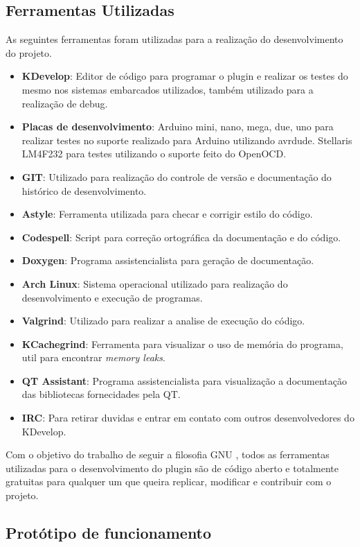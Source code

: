\subsection{Ferramentas Utilizadas}
As seguintes ferramentas foram utilizadas para a realização do desenvolvimento do projeto.
\begin{itemize}
 \item \textbf{KDevelop}: Editor de código para programar o plugin e realizar os testes do mesmo nos sistemas embarcados utilizados,
 também utilizado para a realização de debug.
 \item \textbf{Placas de desenvolvimento}: Arduino mini, nano, mega, due, uno para realizar testes no suporte realizado para Arduino
 utilizando avrdude. Stellaris LM4F232 para testes utilizando o suporte feito do OpenOCD.
 \item \textbf{GIT}: Utilizado para realização do controle de versão e documentação do  histórico de desenvolvimento.
 \item \textbf{Astyle}: Ferramenta utilizada para checar e corrigir estilo do código.
 \item \textbf{Codespell}: Script para correção ortográfica da documentação e do código.
 \item \textbf{Doxygen}: Programa assistencialista para geração de documentação.
 \item \textbf{Arch Linux}: Sistema operacional utilizado para realização do desenvolvimento e execução de programas.
 \item \textbf{Valgrind}: Utilizado para realizar a analise de execução do código.
 \item \textbf{KCachegrind}: Ferramenta para visualizar o uso de memória do programa, util para encontrar \textit{memory leaks}.
 \item \textbf{QT Assistant}: Programa assistencialista para visualização a documentação das bibliotecas fornecidades pela QT.
 \item \textbf{IRC}: Para retirar duvidas e entrar em contato com outros desenvolvedores do KDevelop.
\end{itemize}

Com o objetivo do trabalho de seguir a filosofia GNU \cite{filosogia}, todos as ferramentas utilizadas para o desenvolvimento do plugin
são de código aberto e totalmente gratuitas para qualquer um que queira replicar, modificar e contribuir com o projeto.

\subsection{Protótipo de funcionamento}

